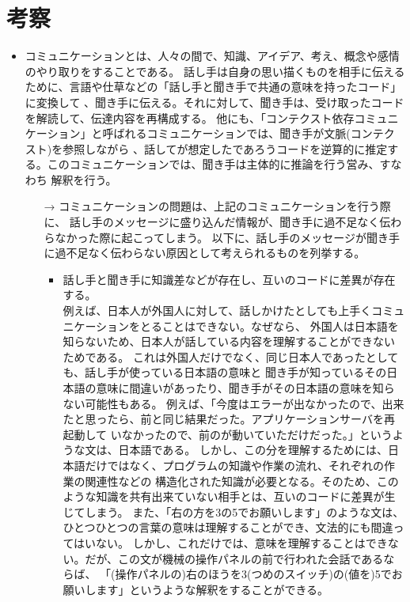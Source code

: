 \documentclass[dvipdfmx]{jsarticle}
\begin{document}
\section{考察}
\begin{itemize}
  \item コミュニケーションとは、人々の間で、知識、アイデア、考え、概念や感情のやり取りをすることである。
  話し手は自身の思い描くものを相手に伝えるために、言語や仕草などの「話し手と聞き手で共通の意味を持ったコード」に変換して
  、聞き手に伝える。それに対して、聞き手は、受け取ったコードを解読して、伝達内容を再構成する。
  他にも、「コンテクスト依存コミュニケーション」と呼ばれるコミュニケーションでは、聞き手が文脈(コンテクスト)を参照しながら
  、話してが想定したであろうコードを逆算的に推定する。このコミュニケーションでは、聞き手は主体的に推論を行う営み、すなわち
  解釈を行う。
  \begin{itemize}
    \item[→] コミュニケーションの問題は、上記のコミュニケーションを行う際に、
    話し手のメッセージに盛り込んだ情報が、聞き手に過不足なく伝わらなかった際に起こってしまう。
    以下に、話し手のメッセージが聞き手に過不足なく伝わらない原因として考えられるものを列挙する。
    \begin{itemize}
      \item 話し手と聞き手に知識差などが存在し、互いのコードに差異が存在する。
      \\例えば、日本人が外国人に対して、話しかけたとしても上手くコミュニケーションをとることはできない。なぜなら、
      外国人は日本語を知らないため、日本人が話している内容を理解することができないためである。
      これは外国人だけでなく、同じ日本人であったとしても、話し手が使っている日本語の意味と
      聞き手が知っているその日本語の意味に間違いがあったり、聞き手がその日本語の意味を知らない可能性もある。
      例えば、「今度はエラーが出なかったので、出来たと思ったら、前と同じ結果だった。アプリケーションサーバを再起動して
      いなかったので、前のが動いていただけだった。」というような文は、日本語である。
      しかし、この分を理解するためには、日本語だけではなく、プログラムの知識や作業の流れ、それぞれの作業の関連性などの
      構造化された知識が必要となる。そのため、このような知識を共有出来ていない相手とは、互いのコードに差異が生じてしまう。
      また、「右の方を3の5でお願いします」のような文は、ひとつひとつの言葉の意味は理解することができ、文法的にも間違ってはいない。
      しかし、これだけでは、意味を理解することはできない。だが、この文が機械の操作パネルの前で行われた会話であるならば、
      「(操作パネルの)右のほうを3(つめのスイッチ)の(値を)5でお願いします」というような解釈をすることができる。

\end{itemize}
\end{itemize}
\end{itemize}
\end{document}
